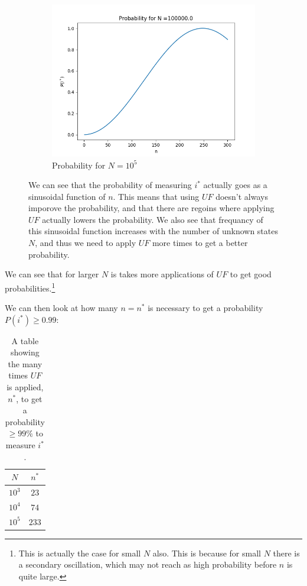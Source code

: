 \documentclass[a4paper,norsk, 10pt]{article}
\begin{document}
\begin{figure}[H]
    \begin{subfigure}[b]{0.3\textwidth}
        \includegraphics[width=\textwidth]{P1e5.png}
        \caption{Probability for $N = 10^5$}
        \label{fig:P1e5}
    \end{subfigure}
    \caption{We can see that the probability of measuring $i^*$ actually goes as a sinusoidal function of $n$. This means that using $UF$ doesn't always imporove the probability, and that there are regoins where applying $UF$ actually lowers the probability. We also see that frequancy of this sinusoidal function increases with the number of unknown states $N$, and thus we need  to apply $UF$ more times to get a better probability.}\label{fig:prob}
\end{figure}


We can see that for larger $N$ is takes more applications of $UF$ to get good probabilities.\footnote{This is actually the case for small $N$ also. This is because for small $N$ there is a secondary oscillation, which may not reach as high probability before $n$ is quite large.}\\

\newpage

We can then look at how many $n = n^*$ is necessary to get a probability $P(i^*)\geq 0.99$:

\begin{table}[H]
\centering
\begin{tabular}{c | c}
$N$ & $n^*$\\
\hline 
$10^3$ & $23$\\
$10^4$ & $74$\\
$10^5$ & $233$
\end{tabular}
\caption{A table showing the many times $UF$ is applied, $n^*$, to get a probability $\geq 99\%$ to measure $i^*$.}
\end{table}
\end{document}
